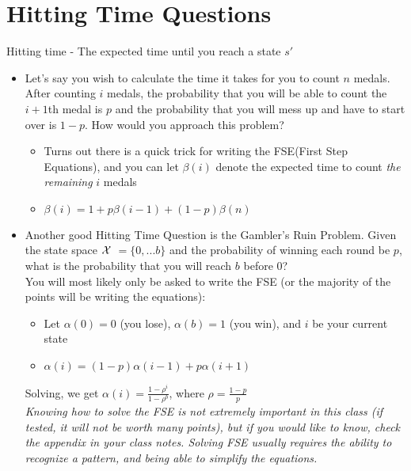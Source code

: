 \documentclass[a4paper]{article}
\begin{document}
\section{Hitting Time Questions}
Hitting time - The expected time until you reach a state $s'$
\begin{itemize}
        \item Let's say you wish to calculate the time it takes for you to count $n$ medals. After counting $i$ medals, the probability that you will be able to count the $i+1$th medal is $p$ and the probability that you will mess up and have to start over is $1-p$. How would you approach this problem?
        \begin{itemize}
            \item Turns out there is a quick trick for writing the FSE(First Step Equations), and you can let $\beta (i)$ denote the expected time to count \textit{the remaining} $i$ medals
            \item $\beta (i) = 1 + p\beta (i - 1) + (1-p)\beta (n)$ 
        \end{itemize}
        \item Another good Hitting Time Question is the Gambler's Ruin Problem. Given the state space $\cal X$ $= \{0,...b\}$ and the probability of winning each round be $p$, what is the probability that you will reach $b$ before 0?\\
        You will most likely only be asked to write the FSE (or the majority of the points will be writing the equations):
        \begin{itemize}
            \item Let $\alpha(0) = 0$ (you lose), $\alpha(b) = 1$ (you win), and $i$ be your current state
            \item $\alpha(i) = (1-p)\alpha(i-1) + p\alpha(i+1)$
        \end{itemize}
        Solving, we get $\alpha(i) = \frac{1 - \rho^i}{1- \rho^b}$, where $\rho = \frac{1-p}{p}$ \\
        \textit{ Knowing how to solve the FSE is not extremely important in this class (if tested, it will not be worth many points), but if you would like to know, check the appendix in your class notes. Solving FSE usually requires the ability to recognize a pattern, and being able to simplify the equations.}
\end{itemize}
\end{document}
